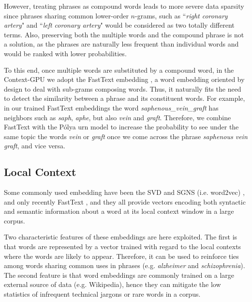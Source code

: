 \documentclass[letterpaper]{article}
\begin{document}
However, treating phrases as compound words leads to more severe data sparsity since phrases sharing common lower-order $n$-grams, such as ``\emph{right coronary artery}" and ``\emph{left coronary artery}" would be considered as two totally different terms. %
Also, preserving both the multiple words and the compound phrase is not a solution, as the phrases are naturally less frequent than individual words and would be ranked with lower probabilities.

To this end, once multiple words are substituted by a compound word, in the Context-GPU we adopt the FastText embedding \cite{Joulin16}, a word embedding oriented by design to deal with sub-grams composing words. Thus, it naturally fits the need to detect the similarity between a phrase and its constituent words. For example, in our trained FastText embeddings the word \textit{saphenous\_vein\_graft} has neighbors such as \textit{saph}, \textit{aphe}, but also \textit{vein} and \textit{graft}.
Therefore, we combine FastText with the P\'{o}lya urn model to increase the probability to see under the same topic the words \textit{vein} or \textit{graft} once we come across the phrase \textit{saphenous vein graft}, and vice versa.



\subsection{Local Context}
Some commonly used embedding have been the SVD \cite{Levy15} and SGNS (i.e. word2vec) \cite{Mikolov13a}, and only recently FastText \cite{Joulin16}, and they all provide vectors encoding both syntactic and semantic information about a word at its local context window in a large corpus.

Two characteristic features of these embeddings are here exploited. The first is that words are represented by a vector trained with regard to the local contexts where the words are likely to appear. Therefore, it can be used to reinforce ties among words sharing common uses in phrases (e.g. \textit{alzheimer} and \textit{schizophrenia}). The second feature is that word embeddings are commonly trained on a large external source of data (e.g. Wikipedia), hence they can mitigate the low statistics of infrequent technical jargons or rare words in a corpus.
\end{document}
